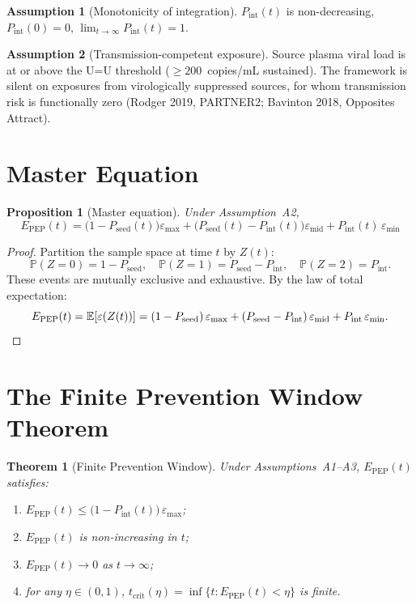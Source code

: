 \documentclass[11pt]{article}
\newtheorem{theorem}{Theorem}[section]
\newtheorem{proposition}{Proposition}[section]
\theoremstyle{definition}
\newtheorem{assumption}{Assumption}[section]
\theoremstyle{remark}
\newcommand{\Pseed}{P_{\text{seed}}}
\newcommand{\Pint}{P_{\text{int}}}
\newcommand{\Epep}{E_{\text{PEP}}}
\newcommand{\tcrit}{t_{\text{crit}}}
\newcommand{\emax}{\varepsilon_{\max}}
\newcommand{\emid}{\varepsilon_{\text{mid}}}
\newcommand{\emin}{\varepsilon_{\min}}
\begin{document}
\begin{assumption}[Monotonicity of integration]
$\Pint(t)$ is non-decreasing, $\Pint(0) = 0$, $\lim_{t\to\infty} \Pint(t) = 1$.
\end{assumption}

\begin{assumption}[Transmission-competent exposure]
Source plasma viral load is at or above the U=U threshold ($\geq 200$~copies/mL sustained). The framework is silent on exposures from virologically suppressed sources, for whom transmission risk is functionally zero (Rodger 2019, PARTNER2; Bavinton 2018, Opposites Attract).
\end{assumption}


\section{Master Equation}

\begin{proposition}[Master equation]\label{prop:master}
Under Assumption~A2,
\begin{equation}
\Epep(t) = \big(1 - \Pseed(t)\big)\emax + \big(\Pseed(t) - \Pint(t)\big)\emid + \Pint(t)\,\emin
\label{eq:master_si}
\end{equation}
\end{proposition}

\begin{proof}
Partition the sample space at time $t$ by $Z(t)$:
\[
\mathbb{P}(Z = 0) = 1 - \Pseed,\quad
\mathbb{P}(Z = 1) = \Pseed - \Pint,\quad
\mathbb{P}(Z = 2) = \Pint.
\]
These events are mutually exclusive and exhaustive. By the law of total expectation:
\[
\Epep(t) = \mathbb{E}[\varepsilon(Z(t))] = (1 - \Pseed)\,\emax + (\Pseed - \Pint)\,\emid + \Pint\,\emin. \qedhere
\]
\end{proof}


\section{The Finite Prevention Window Theorem}

\begin{theorem}[Finite Prevention Window]\label{thm:finite}
Under Assumptions~A1--A3, $\Epep(t)$ satisfies:
\begin{enumerate}[label=\textnormal{(\roman*)},leftmargin=2.5em]
    \item $\Epep(t) \leq \big(1 - \Pint(t)\big)\,\emax$;
    \item $\Epep(t)$ is non-increasing in $t$;
    \item $\Epep(t) \to 0$ as $t \to \infty$;
    \item for any $\eta \in (0,1)$, $\tcrit(\eta) = \inf\{t : \Epep(t) < \eta\}$ is finite.
\end{enumerate}
\end{theorem}
\end{document}
